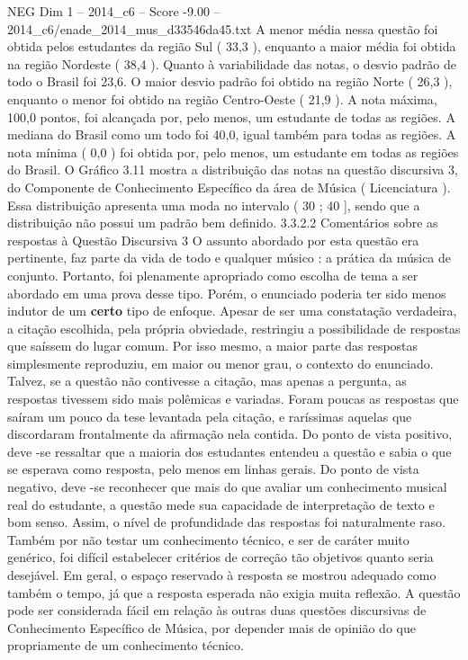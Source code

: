\begin{textsample}{NEG Dim 1 – 2014\_c6 – Score -9.00 – 2014\_c6/enade\_2014\_mus\_d33546da45.txt}
A menor média nessa questão foi obtida pelos estudantes da região Sul ( 33,3 ), enquanto a maior média foi obtida na região Nordeste ( 38,4 ).
Quanto à variabilidade das notas, o desvio padrão de todo o Brasil foi 23,6.
O maior desvio padrão foi obtido na região Norte ( 26,3 ), enquanto o menor foi obtido na região Centro-Oeste ( 21,9 ).
A nota máxima, 100,0 pontos, foi alcançada por, pelo menos, um estudante de todas as regiões.
A mediana do Brasil como um todo foi 40,0, igual também para todas as regiões.
A nota mínima ( 0,0 ) foi obtida por, pelo menos, um estudante em todas as regiões do Brasil.
O Gráfico 3.11 mostra a distribuição das notas na questão discursiva 3, do Componente de Conhecimento Específico da área de Música ( Licenciatura ).
Essa distribuição apresenta uma moda no intervalo ( 30 ; 40 ], sendo que a distribuição não possui um padrão bem definido. 3.3.2.2 Comentários sobre as respostas à Questão Discursiva 3 O assunto abordado por esta questão era pertinente, faz parte da vida de todo e qualquer músico : a prática da música de conjunto.
Portanto, foi plenamente apropriado como escolha de tema a ser abordado em uma prova desse tipo.
Porém, o enunciado poderia ter sido menos indutor de um \textbf{certo} tipo de enfoque.
Apesar de ser uma constatação verdadeira, a citação escolhida, pela própria obviedade, restringiu a possibilidade de respostas que saíssem do lugar comum.
Por isso mesmo, a maior parte das respostas simplesmente reproduziu, em maior ou menor grau, o contexto do enunciado.
Talvez, se a questão não contivesse a citação, mas apenas a pergunta, as respostas tivessem sido mais polêmicas e variadas.
Foram poucas as respostas que saíram um pouco da tese levantada pela citação, e raríssimas aquelas que discordaram frontalmente da afirmação nela contida.
Do ponto de vista positivo, deve -se ressaltar que a maioria dos estudantes entendeu a questão e sabia o que se esperava como resposta, pelo menos em linhas gerais.
Do ponto de vista negativo, deve -se reconhecer que mais do que avaliar um conhecimento musical real do estudante, a questão mede sua capacidade de interpretação de texto e bom senso.
Assim, o nível de profundidade das respostas foi naturalmente raso.
Também por não testar um conhecimento técnico, e ser de caráter muito genérico, foi difícil estabelecer critérios de correção tão objetivos quanto seria desejável.
Em geral, o espaço reservado à resposta se mostrou adequado como também o tempo, já que a resposta esperada não exigia muita reflexão.
A questão pode ser considerada fácil em relação às outras duas questões discursivas de Conhecimento Específico de Música, por depender mais de opinião do que propriamente de um conhecimento técnico.

\end{textsample}
